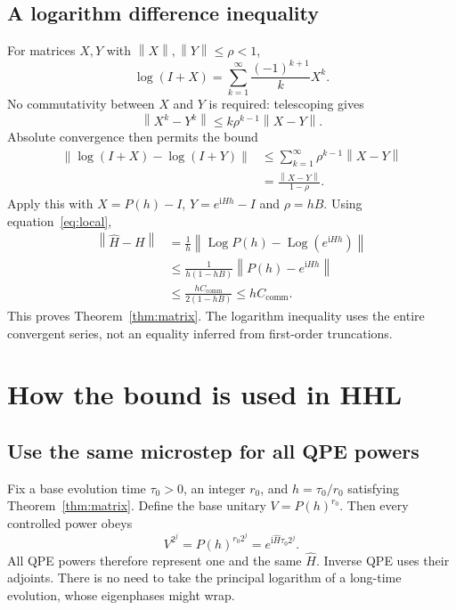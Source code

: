 \documentclass[11pt,a4paper]{article}
\newcommand{\norm}[1]{\left\lVert #1\right\rVert}
\newcommand{\ii}{\mathrm{i}}
\newcommand{\CC}{C_{\mathrm{comm}}}
\begin{document}
\subsection{A logarithm difference inequality}
For matrices $X,Y$ with $\norm X,\norm Y\leq\rho<1$,
\begin{equation}
 \log(I+X)=\sum_{k=1}^{\infty}\frac{(-1)^{k+1}}{k}X^k.
\end{equation}
No commutativity between $X$ and $Y$ is required: telescoping gives
\begin{equation}
 \norm{X^k-Y^k}\leq k\rho^{k-1}\norm{X-Y}.
\end{equation}
Absolute convergence then permits the bound
\begin{align}
 \norm{\log(I+X)-\log(I+Y)}
 &\leq\sum_{k=1}^{\infty}\rho^{k-1}\norm{X-Y}\\
 &=\frac{\norm{X-Y}}{1-\rho}.
\end{align}
Apply this with $X=P(h)-I$, $Y=e^{\ii Hh}-I$ and $\rho=hB$. Using equation~\eqref{eq:local},
\begin{align}
 \norm{\widehat H-H}
 &=\frac1h\norm{\operatorname{Log}P(h)-\operatorname{Log}(e^{\ii Hh})}\\
 &\leq\frac{1}{h(1-hB)}\norm{P(h)-e^{\ii Hh}}\\
 &\leq\frac{h\CC}{2(1-hB)}\leq h\CC.
\end{align}
This proves Theorem~\ref{thm:matrix}. The logarithm inequality uses the entire convergent series, not an equality inferred from first-order truncations.

\section{How the bound is used in HHL}
\subsection{Use the same microstep for all QPE powers}
Fix a base evolution time $\tau_0>0$, an integer $r_0$, and $h=\tau_0/r_0$ satisfying Theorem~\ref{thm:matrix}. Define the base unitary $V=P(h)^{r_0}$. Then every controlled power obeys
\begin{equation}\label{eq:qpe}
 \boxed{V^{2^j}=P(h)^{r_0 2^j}
 =e^{\ii\widehat H\tau_0 2^j}.}
\end{equation}
All QPE powers therefore represent one and the same $\widehat H$. Inverse QPE uses their adjoints. There is no need to take the principal logarithm of a long-time evolution, whose eigenphases might wrap.
\end{document}
